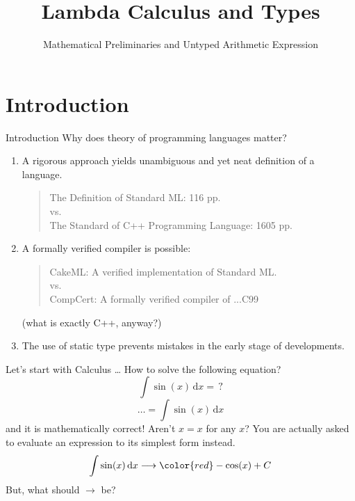 \title{Lambda Calculus and Types}
\subtitle{Mathematical Preliminaries and Untyped Arithmetic Expression}

\begin{frame}
\maketitle
\end{frame}

\section{Introduction}
\begin{frame}{Introduction}
  Why does theory of programming languages matter? 
  \begin{enumerate}
    \item A rigorous approach yields unambiguous and yet neat definition of a
      language. 
     \begin{quote}
       The Definition of Standard ML: 116 pp.\cite{Milner1997} \\
       \quad vs.\\
       The Standard of C++ Programming Language: 1605 pp.
     \end{quote} 
   \item A formally verified compiler is possible: 
     \begin{quote}
       CakeML: A verified implementation of Standard ML. \\
       \quad vs.\\
       CompCert: A formally verified compiler of ...\alert{C99}
     \end{quote} 
     (what is exactly C++, anyway?)
   \item The use of static type prevents mistakes in the early stage of
     developments. 
  \end{enumerate}
\end{frame}

\begin{frame}{Let's start with Calculus \dots}
  How to solve the following equation? 
\[
  \int \sin(x)\,\mathrm{d}x =\, ?
\]
\pause
\[
  \dots = \int \sin(x)\,\mathrm{d}x
\]
and it is mathematically correct! Aren't $x = x$ for any $x$? 
\pause
You are actually asked to \alert{evaluate} an expression to its simplest form
instead. 
\begin{align*}
  \int \sin(x)\,\mathrm{d}x \longrightarrow {\color{red} -\cos(x) + C}
\end{align*}
But, what should $\longrightarrow$ be? 
\end{frame}
